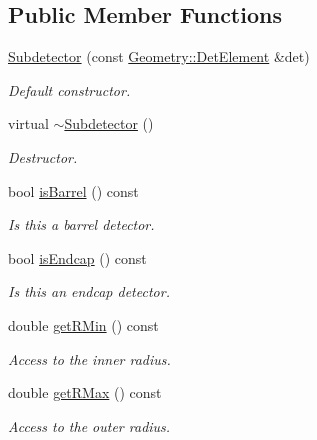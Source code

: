 \subsection*{Public Member Functions}
\begin{DoxyCompactItemize}
\item 
\hyperlink{class_d_d4hep_1_1_d_d_rec_1_1_subdetector_a2583b3d4d1bb2a6bcf8bb711e840bb05}{Subdetector} (const \hyperlink{class_d_d4hep_1_1_geometry_1_1_det_element}{Geometry::DetElement} \&det)
\begin{DoxyCompactList}\small\item\em Default constructor. \item\end{DoxyCompactList}\item 
virtual \hyperlink{class_d_d4hep_1_1_d_d_rec_1_1_subdetector_afae5c6780ba1bd9a99b49e9ee6618ee8}{$\sim$Subdetector} ()
\begin{DoxyCompactList}\small\item\em Destructor. \item\end{DoxyCompactList}\item 
bool \hyperlink{class_d_d4hep_1_1_d_d_rec_1_1_subdetector_a27cd4d214d135172ac3a499d435cfe79}{isBarrel} () const 
\begin{DoxyCompactList}\small\item\em Is this a barrel detector. \item\end{DoxyCompactList}\item 
bool \hyperlink{class_d_d4hep_1_1_d_d_rec_1_1_subdetector_a1f41cf67deb67155ed65657328b317b5}{isEndcap} () const 
\begin{DoxyCompactList}\small\item\em Is this an endcap detector. \item\end{DoxyCompactList}\item 
double \hyperlink{class_d_d4hep_1_1_d_d_rec_1_1_subdetector_a9ab6536e68cb4706ae4f75640d486849}{getRMin} () const 
\begin{DoxyCompactList}\small\item\em Access to the inner radius. \item\end{DoxyCompactList}\item 
double \hyperlink{class_d_d4hep_1_1_d_d_rec_1_1_subdetector_af2a472c02de98a252a5357288cec8839}{getRMax} () const 
\begin{DoxyCompactList}\small\item\em Access to the outer radius. \item\end{DoxyCompactList}\item 

\end{DoxyCompactItemize}
